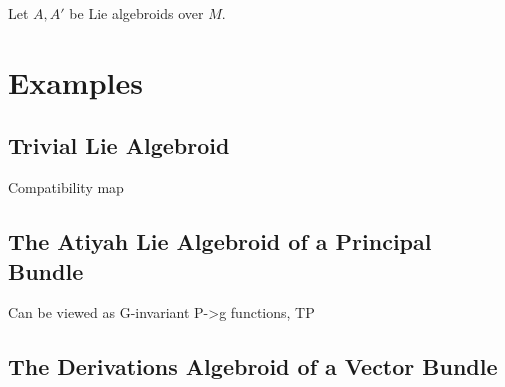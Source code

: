 \begin{definition}
Let $A, A'$ be Lie algebroids over $M$. 
\end{definition}

\begin{definition}[Restriction of $A$ to $U$]

\end{definition}

\begin{definition}

\end{definition}

\begin{definition}

\end{definition}

\begin{definition}[Pullbacks]

\end{definition}

\begin{definition}[Quotients]

\end{definition}

\section{Examples}

\subsection{Trivial Lie Algebroid}

Compatibility map

\subsection{The Atiyah Lie Algebroid of a Principal Bundle}

Can be viewed as G-invariant P->g functions, TP 

\subsection{The Derivations Algebroid of a Vector Bundle}

